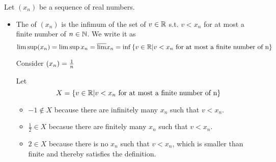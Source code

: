 \documentclass[a4paper,12pt]{article}
\begin{document}
    \begin{definition}
        Let \((x_n)\) be a sequence of real numbers.
        \begin{itemize}
            \item The  of \((x_n)\) is the infimum of the set of \(v\in\mathbb{R}\) s.t. \(v< x_n\) for at most a finite number of \(n\in\mathbb{N}\). We write it as
            \[\limsup(x_n) = \limsup x_n = \overline{\lim}x_n = \inf{\{v\in\mathbb{R}|v<x_n \text{ for at most a finite number of n}\}}\]
            \begin{example}
                Consider \((x_{n})=\frac{1}{n}\)
                \begin{center}
                \end{center}

                Let\[X=\{v\in\mathbb{R}|v<x_n \text{ for at most a finite number of n}\}\]
                \begin{itemize}
                    \item \(-1\notin X\) because there are infinitely many \(x_n\) such that \(v<x_n\).
                    \item \(\frac{1}{2}\in X\) becasue there are finitely many \(x_n\) such that \(v<x_n\).
                    \item \(2\in X\) because there is no \(x_n\) such that \(v<x_n\), which is smaller than finite and thereby satisfies the definition.
                \end{itemize}


\end{example}
\end{itemize}
\end{definition}
\end{document}

